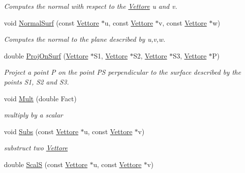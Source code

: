 \begin{DoxyCompactItemize}
\begin{DoxyCompactList}\small\item\em \-Computes the normal with respect to the \hyperlink{classVettore}{\-Vettore} u and v. \end{DoxyCompactList}\item 
\hypertarget{classVettore_a37c16d330917daaf77a01df8d54d2ffa}{void \hyperlink{classVettore_a37c16d330917daaf77a01df8d54d2ffa}{\-Normal\-Surf} (const \hyperlink{classVettore}{\-Vettore} $\ast$u, const \hyperlink{classVettore}{\-Vettore} $\ast$v, const \hyperlink{classVettore}{\-Vettore} $\ast$w)}\label{classVettore_a37c16d330917daaf77a01df8d54d2ffa}

\begin{DoxyCompactList}\small\item\em \-Computes the normal to the plane described by u,v,w. \end{DoxyCompactList}\item 
\hypertarget{classVettore_a0076d507f0189c0bafa974af74afaae7}{double \hyperlink{classVettore_a0076d507f0189c0bafa974af74afaae7}{\-Proj\-On\-Surf} (\hyperlink{classVettore}{\-Vettore} $\ast$\-S1, \hyperlink{classVettore}{\-Vettore} $\ast$\-S2, \hyperlink{classVettore}{\-Vettore} $\ast$\-S3, \hyperlink{classVettore}{\-Vettore} $\ast$\-P)}\label{classVettore_a0076d507f0189c0bafa974af74afaae7}

\begin{DoxyCompactList}\small\item\em \-Project a point \-P on the point \-P\-S perpendicular to the surface described by the points \-S1, \-S2 and \-S3. \end{DoxyCompactList}\item 
\hypertarget{classVettore_a462cc9cf81c1f3a1b3c8b0136d6378d5}{void \hyperlink{classVettore_a462cc9cf81c1f3a1b3c8b0136d6378d5}{\-Mult} (double \-Fact)}\label{classVettore_a462cc9cf81c1f3a1b3c8b0136d6378d5}

\begin{DoxyCompactList}\small\item\em multiply by a scalar \end{DoxyCompactList}\item 
\hypertarget{classVettore_a5c3a30fe490ef9563842299380df3ba5}{void \hyperlink{classVettore_a5c3a30fe490ef9563842299380df3ba5}{\-Subs} (const \hyperlink{classVettore}{\-Vettore} $\ast$u, const \hyperlink{classVettore}{\-Vettore} $\ast$v)}\label{classVettore_a5c3a30fe490ef9563842299380df3ba5}

\begin{DoxyCompactList}\small\item\em substruct two \hyperlink{classVettore}{\-Vettore} \end{DoxyCompactList}\item 
\hypertarget{classVettore_a956dbbb6159671072b4eb5724b60748e}{double \hyperlink{classVettore_a956dbbb6159671072b4eb5724b60748e}{\-Scal\-S} (const \hyperlink{classVettore}{\-Vettore} $\ast$u, const \hyperlink{classVettore}{\-Vettore} $\ast$v)}\label{classVettore_a956dbbb6159671072b4eb5724b60748e}


\end{DoxyCompactItemize}
